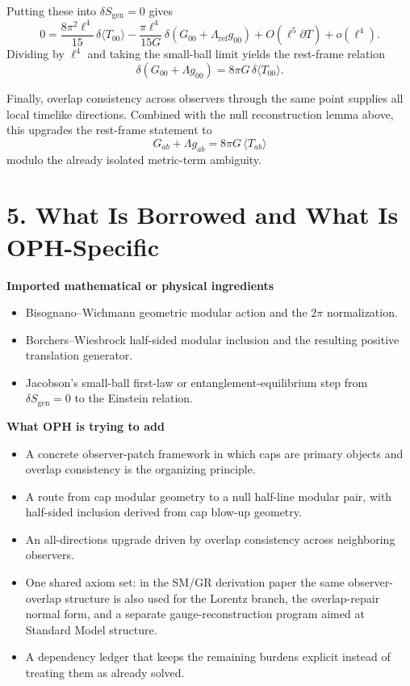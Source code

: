 \documentclass[10pt]{article}
\begin{document}
Putting these into \(\delta S_{\mathrm{gen}}=0\) gives
\[
0
=
\frac{8\pi^2 \ell^4}{15}\,\delta\langle T_{00}\rangle
-\frac{\pi \ell^4}{15G}\,
\delta\!\left(G_{00}+\Lambda_{\mathrm{ref}} g_{00}\right)
+ O(\ell^5 \partial T)+o(\ell^4).
\]
Dividing by \(\ell^4\) and taking the small-ball limit yields the rest-frame relation
\[
\delta\!\left(G_{00}+\Lambda g_{00}\right)
=
8\pi G\,\delta\langle T_{00}\rangle.
\]

Finally, overlap consistency across observers through the same point supplies all local timelike directions. Combined with the null reconstruction lemma above, this upgrades the rest-frame statement to
\[
G_{ab}+\Lambda g_{ab}=8\pi G\,\langle T_{ab}\rangle
\]
modulo the already isolated metric-term ambiguity.

\section*{5. What Is Borrowed and What Is OPH-Specific}

\textbf{Imported mathematical or physical ingredients}
\begin{itemize}[leftmargin=1.8em]
\item Bisognano--Wichmann geometric modular action and the \(2\pi\) normalization.
\item Borchers--Wiesbrock half-sided modular inclusion and the resulting positive translation generator.
\item Jacobson's small-ball first-law or entanglement-equilibrium step from \(\delta S_{\mathrm{gen}}=0\) to the Einstein relation.
\end{itemize}

\textbf{What OPH is trying to add}
\begin{itemize}[leftmargin=1.8em]
\item A concrete observer-patch framework in which caps are primary objects and overlap consistency is the organizing principle.
\item A route from cap modular geometry to a null half-line modular pair, with half-sided inclusion derived from cap blow-up geometry.
\item An all-directions upgrade driven by overlap consistency across neighboring observers.
\item One shared axiom set: in the SM/GR derivation paper the same observer-overlap structure is also used for the Lorentz branch, the overlap-repair normal form, and a separate gauge-reconstruction program aimed at Standard Model structure.
\item A dependency ledger that keeps the remaining burdens explicit instead of treating them as already solved.
\end{itemize}
\end{document}
